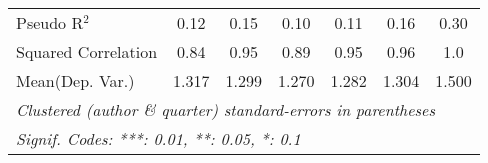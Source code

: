 \begin{tabular}{lcccccc}
   Pseudo R$^2$                                               & 0.12         & 0.15    & 0.10    & 0.11    & 0.16           & 0.30\\  
   Squared Correlation                                        & 0.84         & 0.95    & 0.89    & 0.95    & 0.96           & 1.0\\  
Mean(Dep. Var.) & 1.317 & 1.299 & 1.270 & 1.282 & 1.304 & 1.500 \\
   \midrule \midrule
   \multicolumn{7}{l}{\emph{Clustered (author \& quarter) standard-errors in parentheses}}\\
   \multicolumn{7}{l}{\emph{Signif. Codes: ***: 0.01, **: 0.05, *: 0.1}}\\
\end{tabular}
\par\endgroup
